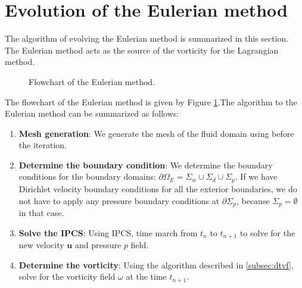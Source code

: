 
\section{Evolution of the Eulerian method}

The algorithm of evolving the Eulerian method is summarized in this section. The Eulerian method acts as the source of the vorticity for the Lagrangian method.

	\begin{figure}[!h]
		\centering
		\caption{Flowchart of the Eulerian method.}
		\label{fig:flowchart_eulerian}
	\end{figure}	
	
The flowchart of the Eulerian method is given by Figure \ref{fig:flowchart_eulerian}.The algorithm to the Eulerian method can be summarized as follows:
	\begin{enumerate}
	\item \textbf{Mesh generation}: We generate the mesh of the fluid domain using \gmsh before the iteration.
	\item \textbf{Determine the boundary condition}: We determine the boundary conditions for the boundary domains: $\partial \Omega_E = \Sigma_{w} \cup \Sigma_{d} \cup \Sigma_{p}$. If we have Dirichlet velocity boundary conditions for all the exterior boundaries, we do not have to apply any pressure boundary conditions at $\partial \Sigma_{p}$, because $\Sigma_{p}=\emptyset$ in that case.
	\item \textbf{Solve the IPCS}: Using IPCS, time march from $t_n$ to $t_{n+1}$ to solve for the new velocity $\mathbf{u}$ and pressure $p$ field.
	\item \textbf{Determine the vorticity}: Using the algorithm described in \ref{subsec:dtvf}, solve for the vorticity field $\omega$ at the time $t_{n+1}$. 
	\end{enumerate}
	
